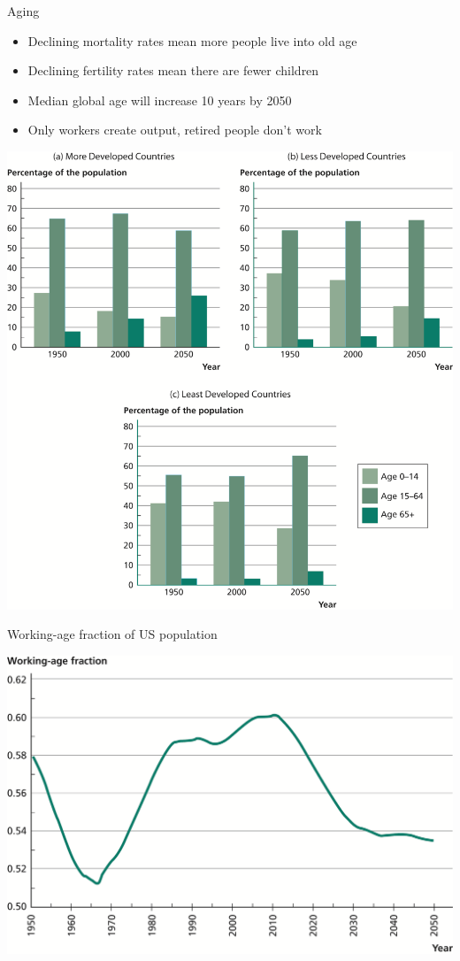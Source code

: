 \documentclass[10pt]{beamer}
\begin{document}
\begin{frame}[label={sec:orgaa9f537}]{}
\alert{Aging}
\begin{itemize}
\item Declining mortality rates mean more people live into old age
\item Declining fertility rates mean there are fewer children
\item Median global age will increase 10 years by 2050
\item Only workers create output, retired people don't work
\end{itemize}
\end{frame}

\begin{frame}[label={sec:org3e9e334}]{}
\begin{center}
\includegraphics[width=.75\textwidth]{./img/5.6.png}
\end{center}
\end{frame}

\begin{frame}[label={sec:org4556f33}]{Working-age fraction of US population}
\begin{center}
\includegraphics[width=.75\textwidth]{./img/5.7.png}
\end{center}
\end{frame}
\end{document}
